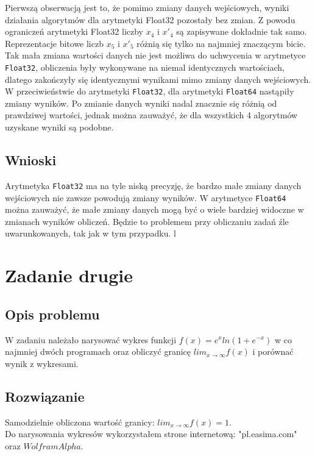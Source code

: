 \documentclass[8pt,letterpaper]{article}
\begin{document}
\hspace{1.0 cm}Pierwszą obserwacją jest to, że pomimo zmiany danych wejściowych, wyniki działania algorytmów dla arytmetyki Float32 pozostały bez zmian. Z powodu ograniczeń arytmetyki Float32 liczby $x_4$ i $x'_4$ są zapisywane dokładnie tak samo. Reprezentacje bitowe liczb $x_5$ i $x'_5$ różnią się tylko na najmniej znaczącym bicie. Tak mała zmiana wartości danych nie jest możliwa do uchwycenia w arytmetyce \texttt{Float32}, obliczenia były wykonywane na niemal identycznych wartościach, dlatego zakończyły się identycznymi wynikami mimo zmiany danych wejściowych.\\
\hspace*{1.5 cm}W przeciwieństwie do arytmetyki \texttt{Float32}, dla arytmetyki \texttt{Float64} nastąpiły zmiany wyników. Po zmianie danych wyniki nadal znacznie się różnią od prawdziwej wartości, jednak można zauważyć, że dla wszystkich 4 algorytmów uzyskane wyniki są podobne.

\subsection{Wnioski}

\hspace{1.0 cm} Arytmetyka \texttt{Float32} ma na tyle niską precyzję, że bardzo małe zmiany danych wejściowych nie zawsze powodują zmiany wyników. W arytmetyce \texttt{Float64} można zauważyć, że małe zmiany danych mogą być o wiele bardziej widoczne w zmianach wyników obliczeń. Będzie to problemem przy obliczaniu zadań źle uwarunkowanych, tak jak w tym przypadku. l
 

\section{Zadanie drugie}
\subsection{Opis problemu}
\hspace{1.0 cm}W zadaniu należało narysować wykres funkcji $f(x) = e^x ln(1 + e^{-x})$ w co najmniej dwóch programach oraz obliczyć granicę $lim_{x \rightarrow \infty} f(x)$ i porównać wynik z wykresami.


\subsection{Rozwiązanie}
\hspace{1.0 cm} Samodzielnie obliczona wartość granicy: $lim_{x \rightarrow \infty} f(x) = 1$.\\ Do narysowania wykresów wykorzystałem strone internetową: "pl.easima.com" oraz $WolframAlpha$.
\end{document}
